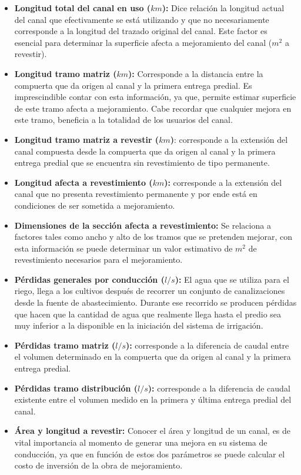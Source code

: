 \documentclass[]{article}
\begin{document}
\begin{itemize}
\item \textbf{Longitud total del canal en uso ($km$):} Dice relación la longitud actual del canal que efectivamente se está utilizando y que no necesariamente corresponde a la longitud del trazado original del canal. Este factor es esencial para determinar la superficie afecta a mejoramiento del canal ($m^2$ a revestir).
\item \textbf{Longitud tramo matriz ($km$):} Corresponde a la distancia entre la compuerta que da origen al canal y la primera entrega predial. Es imprescindible contar con esta información, ya que, permite estimar superficie de este tramo afecta a mejoramiento. Cabe recordar que cualquier mejora en este tramo, beneficia a la totalidad de los usuarios del canal.
\item \textbf{Longitud tramo matriz a revestir ($km$)}: corresponde a la extensión del canal compuesta desde la compuerta que da origen al canal y la primera entrega predial que se encuentra sin revestimiento de tipo permanente.
\item \textbf{Longitud afecta a revestimiento ($km$):} corresponde a la extensión del canal que no presenta revestimiento permanente y por ende está en condiciones de ser sometida a mejoramiento.
\item \textbf{Dimensiones de la sección afecta a revestimiento:} Se relaciona a factores tales como ancho y alto de los tramos que se pretenden mejorar, con esta información se puede determinar un valor estimativo de $m^2$ de revestimiento necesarios para el mejoramiento.
\item \textbf{Pérdidas generales por conducción ($l/s$):} El agua que se utiliza para el riego, llega a los cultivos después de recorrer un conjunto de canalizaciones desde la fuente de abastecimiento. Durante ese recorrido se producen pérdidas que hacen que la cantidad de agua que realmente llega hasta el predio sea muy inferior a la disponible en la iniciación del sistema de irrigación.
\item \textbf{Pérdidas tramo matriz ($l/s$):} corresponde a la diferencia de caudal entre el volumen determinado en la compuerta que da origen al canal y la primera entrega predial.
\item \textbf{Pérdidas tramo distribución ($l/s$):} corresponde a la diferencia de caudal existente entre el volumen medido en la primera y última entrega predial del canal.
\item \textbf{Área y longitud a revestir:} Conocer el área y longitud de un canal, es de vital importancia al momento de generar una mejora en su sistema de conducción, ya que en función de estos dos parámetros se puede calcular el costo de inversión de la obra de mejoramiento.
\end{itemize}
\end{document}
